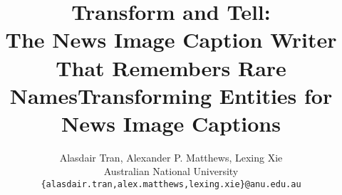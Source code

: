 \documentclass[10pt,twocolumn,letterpaper]{article}
\begin{document}
\title{Transform and Tell:\\The News Image Caption Writer That Remembers Rare Names}
\title{Transforming Entities for News Image Captions}

\author{Alasdair Tran, Alexander P. Matthews, Lexing Xie\\
Australian National University\\
{\tt\small \{alasdair.tran,alex.matthews,lexing.xie\}@anu.edu.au}
}

\maketitle










{\small


}
\end{document}

